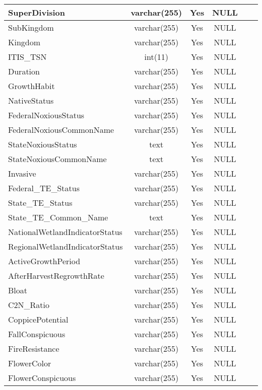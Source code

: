 \begin{enumerate}
\begin{longtable}{|l|c|c|c|l|l|}
SuperDivision & varchar(255) & Yes & NULL &  &  \\ \hline 
SubKingdom & varchar(255) & Yes & NULL &  &  \\ \hline 
Kingdom & varchar(255) & Yes & NULL &  &  \\ \hline 
ITIS\_TSN & int(11) & Yes & NULL &  &  \\ \hline 
Duration & varchar(255) & Yes & NULL &  &  \\ \hline 
GrowthHabit & varchar(255) & Yes & NULL &  &  \\ \hline 
NativeStatus & varchar(255) & Yes & NULL &  &  \\ \hline 
FederalNoxiousStatus & varchar(255) & Yes & NULL &  &  \\ \hline 
FederalNoxiousCommonName & varchar(255) & Yes & NULL &  &  \\ \hline 
StateNoxiousStatus & text & Yes & NULL &  &  \\ \hline 
StateNoxiousCommonName & text & Yes & NULL &  &  \\ \hline 
Invasive & varchar(255) & Yes & NULL &  &  \\ \hline 
Federal\_TE\_Status & varchar(255) & Yes & NULL &  &  \\ \hline 
State\_TE\_Status & varchar(255) & Yes & NULL &  &  \\ \hline 
State\_TE\_Common\_Name & text & Yes & NULL &  &  \\ \hline 
NationalWetlandIndicatorStatus & varchar(255) & Yes & NULL &  &  \\ \hline 
RegionalWetlandIndicatorStatus & varchar(255) & Yes & NULL &  &  \\ \hline 
ActiveGrowthPeriod & varchar(255) & Yes & NULL &  &  \\ \hline 
AfterHarvestRegrowthRate & varchar(255) & Yes & NULL &  &  \\ \hline 
Bloat & varchar(255) & Yes & NULL &  &  \\ \hline 
C2N\_Ratio & varchar(255) & Yes & NULL &  &  \\ \hline 
CoppicePotential & varchar(255) & Yes & NULL &  &  \\ \hline 
FallConspicuous & varchar(255) & Yes & NULL &  &  \\ \hline 
FireResistance & varchar(255) & Yes & NULL &  &  \\ \hline 
FlowerColor & varchar(255) & Yes & NULL &  &  \\ \hline 
FlowerConspicuous & varchar(255) & Yes & NULL &  &  \\ \hline 

\end{longtable}
\end{enumerate}
